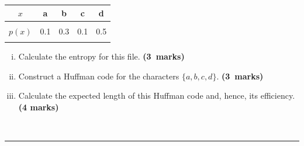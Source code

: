\documentclass[12pt]{article}
\begin{document}
\begin{enumerate}[a)]
\begin{center}
\begin{tabular}{|c|cccc|}
$x$        & a & b & c & d \\
\hline
&&&&\\[-0.4cm]
$p(x)$ & 0.1 & 0.3 & 0.1 & 0.5 \\
\hline
\multicolumn{5}{c}{}
\end{tabular}
\end{center}
    \begin{enumerate}[i)]\itemsep0.3cm
    \item Calculate the entropy for this file. \hfill{\mbox{\scriptsize \bf (3 marks)}}
    \item Construct a Huffman code for the characters $\{a,b,c,d\}$. \hfill{\mbox{\scriptsize \bf (3 marks)}}
    \item Calculate the expected length of this Huffman code and, hence, its efficiency. \hfill{\scriptsize \bf (4 marks)}
    \end{enumerate}
\end{enumerate}
\quad\\[-0.3cm]
\noindent\rule{\linewidth}{1pt}




\newpage
\end{document}
